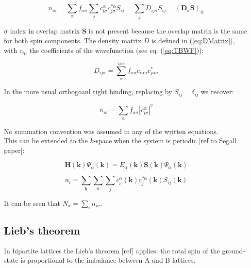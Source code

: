 \documentclass[amsmath,%
amssymb,prb,superscriptaddress]{revtex4}
\begin{document}
\begin{equation}
n_{i\sigma} = \sum_{\alpha}f_{\alpha\sigma}\sum_{j}c^{\alpha}_{i\sigma}c^{*\alpha}_{j\sigma}S_{ij} = \sum_{j}D_{ij\sigma}S_{ij} =  (\textbf{D}_{\sigma}\textbf{S})_{ii}
\end{equation}

$\sigma$ index in overlap matrix $\textbf{S}$ is not present because the overlap matrix is the same for both spin components.
The density matrix $D$ is defined in (\ref{eq:DMatrix}), with $c_{i\mu}$ the coefficients of the wavefunction (see eq. (\ref{eq:TBWF})):

\begin{equation}\label{eq:DMatrix}
D_{ij\sigma} = \sum_{\alpha}^{occ}f_{\alpha\sigma}c_{i \alpha\sigma}c^{*}_{j \alpha\sigma}
\end{equation}


In the more usual orthogoanl tight binding, replacing by $S_{ij}=\delta_{ij}$  we recover:

\begin{equation}
n_{i\sigma} = \sum_{\alpha}f_{\alpha\sigma}\left| c^{\alpha}_{i\sigma}\right|^{2}
\end{equation}


No summation convention was assumed in any of the written equations.\\

This can be extended to the $k$-space when the system is periodic [ref to Segall paper]:


\begin{equation}
\textbf{H}(\textbf{k})\Psi_{\alpha}(\textbf{k}) = E_{\alpha}(\textbf{k})\textbf{S}(\textbf{k})\Psi_{\alpha}(\textbf{k})
\end{equation}

\begin{equation}
n_{i} = \sum_{\textbf{k}}\sum_{\alpha}\sum_{j}c^{\alpha}_{i}(\textbf{k})c^{*\alpha}_{j}(\textbf{k})S_{ij}(\textbf{k})
\end{equation}


It can be seen that $N_{\sigma}=\sum_{i}n_{i\sigma}$.


\subsection{Lieb's theorem}

In bipartite lattices the Lieb's theorem [ref] applies: the total spin of the ground-state is proportional to the imbalance between A and B lattices.
\end{document}
